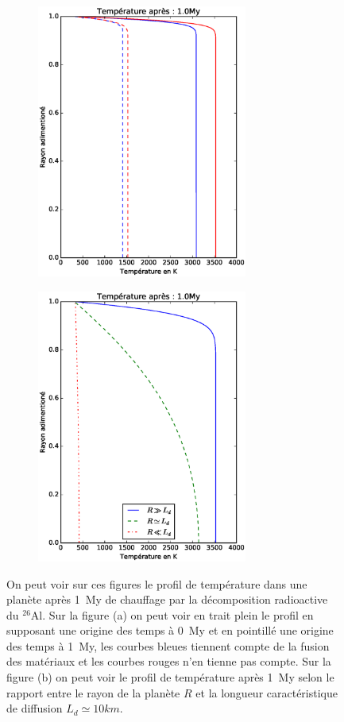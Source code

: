 \documentclass[10pt,a4paper]{article}
\numberwithin{equation}{section}
\begin{document}
\begin{figure}
\centering
\begin{subfigure}{.5\textwidth}
  \centering
  
  \includegraphics[height=9cm]{./figures/graph_sim1_fig1.eps}
  \caption{}
  \label{fig:sub1}
\end{subfigure}%
\begin{subfigure}{.5\textwidth}
  \centering
  \includegraphics[height=9cm]{./figures/graph_sim1_fig2.eps}
  \caption{}
  \label{fig:sub2}
\end{subfigure}
\caption{On peut voir sur ces figures le profil de température dans une planète après \SI{1}{My} de chauffage par la décomposition radioactive du $^{26}$Al. Sur la figure (a) on peut voir en trait plein le profil en supposant une origine des temps à \SI{0}{My} et en pointillé une origine des temps à \SI{1}{My}, les courbes bleues tiennent compte de la fusion des matériaux et les courbes rouges n'en tienne pas compte. Sur la figure (b) on peut voir le profil de température après \SI{1}{My} selon le rapport entre le rayon de la planète $R$ et la longueur caractéristique de diffusion $L_d \simeq 10 km $. }
\label{fig:test}
\end{figure}
\end{document}
